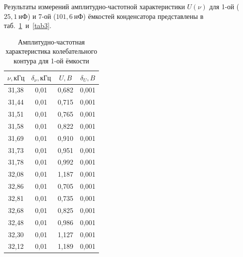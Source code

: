 \documentclass[a4paper, 12pt]{article}
\begin{document}
Результаты измерений амплитудно-частотной характеристики $U(\nu)$ для 1-ой ($25,1~нФ$) и 7-ой ($101,6~нФ$) ёмкостей конденсатора представлены в таб.~\ref{tab2}~и~\ref{tab3}.

\begin{table}[h!]
\begin{center}
\begin{tabular}{|c|c|c|c|}
\hline
$\nu, кГц$ & $\delta_{\nu}, кГц$ & $U, B$  & $\delta_U, B$ \\ \hline
31,38  & 0,01    & 0,682 & 0,001 \\ \hline
31,44  & 0,01    & 0,715 & 0,001 \\ \hline
31,51  & 0,01    & 0,765 & 0,001 \\ \hline
31,58  & 0,01    & 0,822 & 0,001 \\ \hline
31,69  & 0,01    & 0,910 & 0,001 \\ \hline
31,73  & 0,01    & 0,951 & 0,001 \\ \hline
31,78  & 0,01    & 0,992 & 0,001 \\ \hline
32,08  & 0,01    & 1,187 & 0,001 \\ \hline
32,86  & 0,01    & 0,705 & 0,001 \\ \hline
32,81  & 0,01    & 0,735 & 0,001 \\ \hline
32,68  & 0,01    & 0,825 & 0,001 \\ \hline
32,48  & 0,01    & 0,986 & 0,001 \\ \hline
32,30  & 0,01    & 1,127 & 0,001 \\ \hline
32,12  & 0,01    & 1,189 & 0,001 \\ \hline
\end{tabular}
\end{center}
\caption{Амплитудно-частотная характеристика колебательного контура для 1-ой ёмкости}
\label{tab2}
\end{table}
\end{document}
